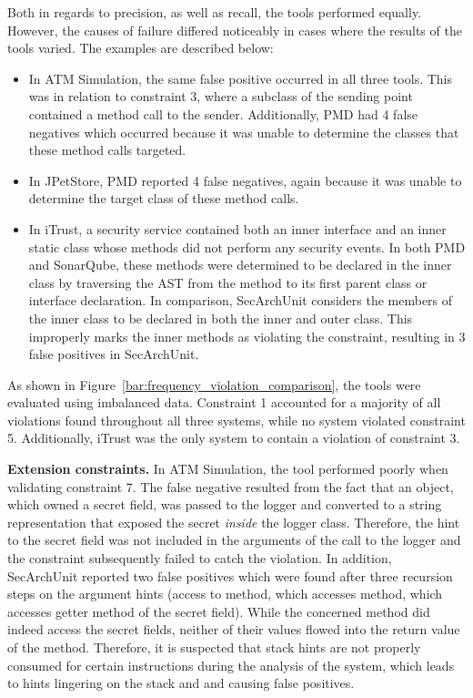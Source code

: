 Both in regards to precision, as well as recall, the tools performed equally. However, the causes of failure differed noticeably in cases where the results of the tools varied. The examples are described below:

\begin{itemize}
    \item In ATM Simulation, the same false positive occurred in all three tools. This was in relation to constraint 3, where a subclass of the sending point contained a method call to the sender. Additionally, PMD had 4 false negatives which occurred because it was unable to determine the classes that these method calls targeted.
    \item In JPetStore, PMD reported 4 false negatives, again because it was unable to determine the target class of these method calls.
    \item In iTrust, a security service contained both an inner interface and an inner static class whose methods did not perform any security events. In both PMD and SonarQube, these methods were determined to be declared in the inner class by traversing the AST from the method to its first parent class or interface declaration. In comparison, SecArchUnit considers the members of the inner class to be declared in both the inner and outer class. This improperly marks the inner methods as violating the constraint, resulting in 3 false positives in SecArchUnit.
\end{itemize}

As shown in Figure~\ref{bar:frequency_violation_comparison}, the tools were evaluated using imbalanced data. Constraint 1 accounted for a majority of all violations found throughout all three systems, while no system violated constraint 5. Additionally, iTrust was the only system to contain a violation of constraint 3. 

\textbf{Extension constraints.}
In ATM Simulation, the tool performed poorly when validating constraint 7. The false negative resulted from the fact that an object, which owned a secret field, was passed to the logger and converted to a string representation that exposed the secret \textit{inside} the logger class. Therefore, the hint to the secret field was not included in the arguments of the call to the logger and the constraint subsequently failed to catch the violation. In addition, SecArchUnit reported two false positives which were found after three recursion steps on the argument hints (access to method, which accesses method, which accesses getter method of the secret field). While the concerned method did indeed access the secret fields, neither of their values flowed into the return value of the method. Therefore, it is suspected that stack hints are not properly consumed for certain instructions during the analysis of the system, which leads to hints lingering on the stack and and causing false positives.

